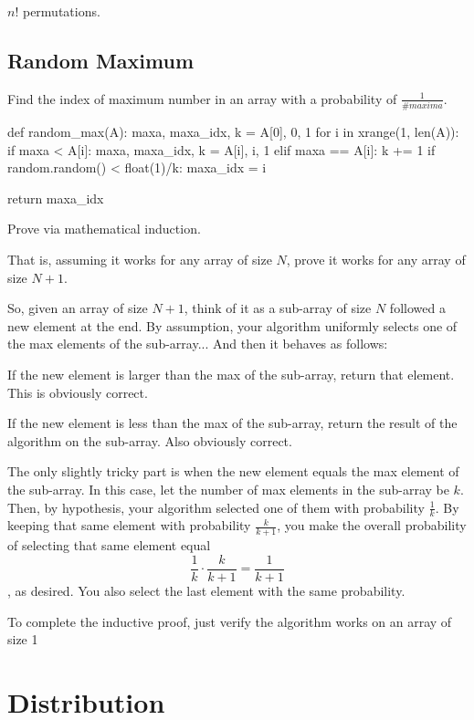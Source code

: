 
$n!$ permutations. 

\subsection{Random Maximum}
Find the index of maximum number in an array with a probability of $\frac{1}{\#maxima}$.


\begin{python}
def random_max(A):
    maxa, maxa_idx, k = A[0], 0, 1
    for i in xrange(1, len(A)):
        if maxa < A[i]:
            maxa, maxa_idx, k = A[i], i, 1
        elif maxa == A[i]:
            k += 1 
            if random.random() < float(1)/k:
                maxa_idx = i

    return maxa_idx

\end{python}
 
 Prove via mathematical induction. 

That is, assuming it works for any array of size $N$, prove it works for any array of size $N+1$.

So, given an array of size $N+1$, think of it as a sub-array of size $N$ followed a new element at the end. By assumption, your algorithm uniformly selects one of the max elements of the sub-array... And then it behaves as follows:

If the new element is larger than the max of the sub-array, return that element. This is obviously correct.

If the new element is less than the max of the sub-array, return the result of the algorithm on the sub-array. Also obviously correct.

The only slightly tricky part is when the new element equals the max element of the sub-array. In this case, let the number of max elements in the sub-array be $k$. Then, by hypothesis, your algorithm selected one of them with probability $\frac{1}{k}$. By keeping that same element with probability $\frac{k}{k+1}$, you make the overall probability of selecting that same element equal $$\frac{1}{k} \cdot \frac{k}{k+1} = \frac{1}{k+1}$$, as desired. You also select the last element with the same probability.

To complete the inductive proof, just verify the algorithm works on an array of size 1


\section{Distribution}
